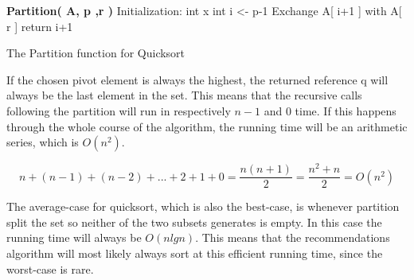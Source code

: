 \begin{algorithm}
	\DontPrintSemicolon
	\textbf{Partition( A, p ,r )}\;
	Initialization:\;
	int x\;
	int i <- p-1\;
	Exchange A[ i+1 ] with A[ r ]\;
	return i+1\;
	\label{Partition}
	\caption{The Partition function for Quicksort}
\end{algorithm}

If the chosen pivot element is always the highest, the returned reference q will always be the last element in the set. This means that the recursive calls following the partition will run in respectively $n-1$ and $0$ time. If this happens through the whole course of the algorithm, the running time will be an arithmetic series\cite{AlgoAnal2},  which is $O(n^2)$.

\[
n + (n-1) + (n-2) + ... + 2 + 1 + 0 = \frac{n(n + 1)}{2}  = \frac{n^2 + n}{2} = O(n^2)
\]

The average-case for quicksort, which is also the best-case, is whenever partition split the set so neither of the two subsets generates is empty. In this case the running time will always be $O(nlgn)$. This means that the recommendations algorithm will most likely always sort at this efficient running time, since the worst-case is rare.